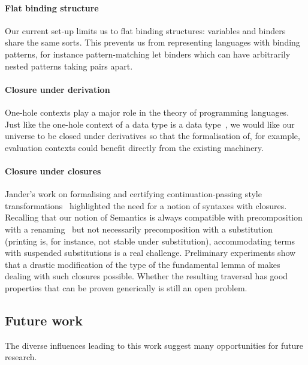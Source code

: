 \paragraph*{Flat binding structure} Our current set-up limits us to flat binding
structures: variables and binders share the same sorts. This prevents us from
representing languages with binding patterns, for instance pattern-matching
let binders which can have arbitrarily nested patterns taking pairs apart.

\paragraph*{Closure under derivation} One-hole contexts play a major role in the
theory of programming languages. Just like the one-hole context of a data type is
a data type~\cite{DBLP:journals/fuin/AbbottAMG05}, we would like our universe to
be closed under derivatives so that the formalisation of, for example, evaluation contexts
could benefit directly from the existing machinery.

\paragraph*{Closure under closures} Jander's work on formalising and certifying
continuation-passing style transformations~\cite{Jander:Thesis:2019}
highlighted the need for a notion of syntaxes with closures. Recalling
that our notion of Semantics is always compatible with precomposition
with a renaming~\cite{Kaiser-wsdebr} but not necessarily
precomposition with a substitution (printing is, for instance, not
stable under substitution), accommodating terms with suspended
substitutions is a real challenge. Preliminary experiments show that a
drastic modification of the type of the fundamental lemma of
 makes dealing with such closures possible. Whether the
resulting traversal has good properties that can be proven generically
is still an open problem.

\subsection{Future work}

The diverse influences leading to this work suggest many opportunities for
future research.

